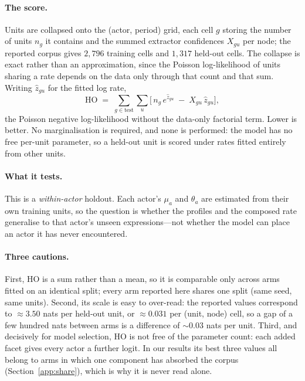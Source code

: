 \paragraph{The score.} Units are collapsed onto the (actor, period) grid, each cell $g$
storing the number of units $n_g$ it contains and the summed extractor confidences
$X_{gu}$ per node; the reported corpus gives $2{,}796$ training cells and $1{,}317$
held-out cells. The collapse is exact rather than an approximation, since the Poisson
log-likelihood of units sharing a rate depends on the data only through that count and
that sum. Writing $\hat z_{gu}$ for the fitted log rate,
\[
  \mathrm{HO}\;=\;\sum_{g\in\text{test}}\sum_u\Big[\,n_g\,e^{\hat z_{gu}}
  \;-\;X_{gu}\,\hat z_{gu}\Big],
\]
the Poisson negative log-likelihood without the data-only factorial term. Lower is
better. No marginalisation is required, and none is performed: the model has no free
per-unit parameter, so a held-out unit is scored under rates fitted entirely from other
units.

\paragraph{What it tests.} This is a \emph{within-actor} holdout. Each actor's $\mu_a$
and $\theta_a$ are estimated from their own training units, so the question is whether
the profiles and the composed rate generalise to that actor's unseen expressions---not
whether the model can place an actor it has never encountered.

\paragraph{Three cautions.} First, $\mathrm{HO}$ is a sum rather than a mean, so it is
comparable only across arms fitted on an identical split; every arm reported here shares
one split (same seed, same units). Second, its scale is easy to over-read: the reported
values correspond to $\approx 3.50$ nats per held-out unit, or $\approx 0.031$ per
(unit, node) cell, so a gap of a few hundred nats between arms is a difference of
$\sim\!0.03$ nats per unit. Third, and decisively for model selection,
$\mathrm{HO}$ is not free of the parameter count: each added facet gives every actor a
further logit. In our results its best three values all belong to arms in which one
component has absorbed the corpus (Section~\ref{app:share}), which is why it is never
read alone.

